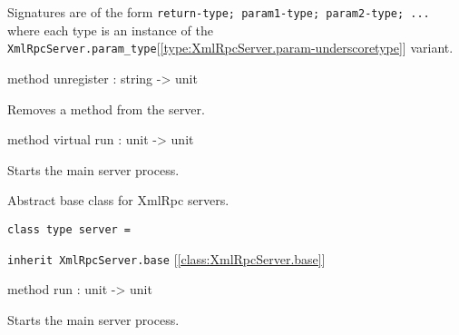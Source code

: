\documentclass[11pt]{article}
\begin{document}
\begin{ocamldocobjectend}
\begin{ocamldocdescription}
      Signatures are of the form {\tt{return-type; param1-type; param2-type; ...}}
      where each type is an instance of the {\tt{XmlRpcServer.param\_type}}[\ref{type:XmlRpcServer.param-underscoretype}] variant.


\end{ocamldocdescription}


\label{method:XmlRpcServer.base.unregister}\begin{ocamldoccode}
method unregister : string -> unit
\end{ocamldoccode}
\begin{ocamldocdescription}
Removes a method from the server.


\end{ocamldocdescription}


\label{method:XmlRpcServer.base.run}\begin{ocamldoccode}
method virtual run : unit -> unit
\end{ocamldoccode}
\begin{ocamldocdescription}
Starts the main server process.


\end{ocamldocdescription}
\end{ocamldocobjectend}


\begin{ocamldocdescription}
Abstract base class for XmlRpc servers.


\end{ocamldocdescription}




\begin{ocamldoccode}
{\tt{class type server = }}\end{ocamldoccode}
\label{classtype:XmlRpcServer.server}

\begin{ocamldocobjectend}


{\tt{inherit XmlRpcServer.base}} [\ref{class:XmlRpcServer.base}]

\label{method:XmlRpcServer.server.run}\begin{ocamldoccode}
method run : unit -> unit
\end{ocamldoccode}
\begin{ocamldocdescription}
Starts the main server process.


\end{ocamldocdescription}
\end{ocamldocobjectend}
\end{document}
